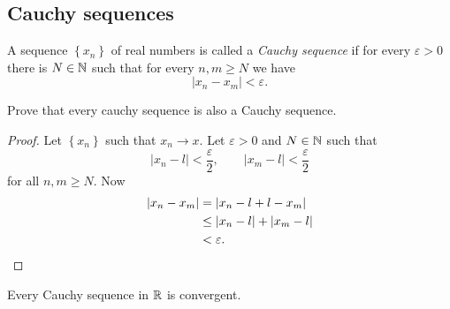 
\subsection{Cauchy sequences}

\begin{definition}[]
	A sequence $\left\{ x_n \right\}$ of real numbers
	is called a \emph{Cauchy sequence} if for every $\varepsilon > 0$
	there is $N \in \mathbb{N}$ such that for every $n, m \geq N$ we have \[
		\left\lvert x_n - x_m \right\rvert < \varepsilon.
	\]
\end{definition}

\begin{problem}
	Prove that every cauchy sequence is also a Cauchy sequence.
\end{problem}

\begin{proof}
	Let $\left\{ x_n \right\}$ such that $x_n \to x$.
	Let $\varepsilon > 0$ and $N \in \mathbb{N}$ such that \[
		\left\lvert x_n - l \right\rvert < \frac{\varepsilon}2, \qquad
		\left\lvert x_m - l \right\rvert < \frac{\varepsilon}2
	\]
	for all $n, m \geq N$.
	Now
	\begin{align*}
		\left\lvert x_n - x_m \right\rvert
		&=    \left\lvert x_n - l + l - x_m \right\rvert \\
		&\leq \left\lvert x_n - l \right\rvert 
			+ \left\lvert x_m - l \right\rvert \\
		&<    \varepsilon. \qedhere
	\end{align*}
\end{proof}

\begin{theorem}[]
	Every Cauchy sequence in $\mathbb{R}$ is convergent.
\end{theorem}

